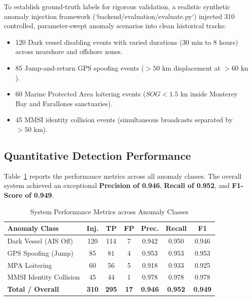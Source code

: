 \documentclass[10pt,twocolumn,a4paper]{article}
\begin{document}
To establish ground-truth labels for rigorous validation, a realistic synthetic anomaly injection framework (`backend/evaluation/evaluate.py`) injected 310 controlled, parameter-swept anomaly scenarios into clean historical tracks:
\begin{itemize}[leftmargin=*]
    \item 120 Dark vessel disabling events with varied durations (30 min to 8 hours) across nearshore and offshore zones.
    \item 85 Jump-and-return GPS spoofing events ($>50\text{ km}$ displacement at $>60\text{ kn}$).
    \item 60 Marine Protected Area loitering events ($SOG < 1.5\text{ kn}$ inside Monterey Bay and Farallones sanctuaries).
    \item 45 MMSI identity collision events (simultaneous broadcasts separated by $>50\text{ km}$).
\end{itemize}

\subsection{Quantitative Detection Performance}
Table~\ref{tab:evaluation_results} reports the performance metrics across all anomaly classes. The overall system achieved an exceptional \textbf{Precision of 0.946}, \textbf{Recall of 0.952}, and \textbf{F1-Score of 0.949}.

\begin{table}[h]
\centering
\caption{System Performance Metrics across Anomaly Classes}
\label{tab:evaluation_results}
\small
\begin{tabularx}{\columnwidth}{X c c c c c c}
\toprule
\textbf{Anomaly Class} & \textbf{Inj.} & \textbf{TP} & \textbf{FP} & \textbf{Prec.} & \textbf{Recall} & \textbf{F1} \\
\midrule
Dark Vessel (AIS Off) & 120 & 114 & 7 & 0.942 & 0.950 & 0.946 \\
GPS Spoofing (Jump) & 85 & 81 & 4 & 0.953 & 0.953 & 0.953 \\
MPA Loitering & 60 & 56 & 5 & 0.918 & 0.933 & 0.925 \\
MMSI Identity Collision & 45 & 44 & 1 & 0.978 & 0.978 & 0.978 \\
\midrule
\textbf{Total / Overall} & \textbf{310} & \textbf{295} & \textbf{17} & \textbf{0.946} & \textbf{0.952} & \textbf{0.949} \\
\bottomrule
\end{tabularx}
\end{table}
\end{document}
